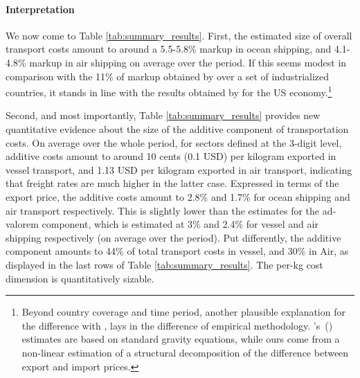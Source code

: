 \documentclass[a4paper,11pt]{article}
\newcommand\cites[1]{\citeauthor{#1}'s\ (\citeyear{#1})}
\begin{document}



\paragraph{Interpretation} We now come to Table \ref{tab:summary_results}. First, the estimated size of overall transport costs amount to around a 5.5-5.8\% markup in ocean shipping, and 4.1-4.8\% markup in air shipping on average over the period.
If this seems modest in comparison with the 11\% of markup obtained by \cite{anderson_wincoop_jel} over a set of industrialized countries, it stands in line with the results obtained by \cite{hummels2007} for the US economy.\footnote{Beyond country coverage and time period, another plausible explanation for the difference with \cite{anderson_wincoop_jel}, lays in the difference of empirical methodology. \cites{anderson_wincoop_jel} estimates are based on standard gravity equations, while ours come from a non-linear estimation of a structural decomposition of the difference between export and import prices.}

Second, and most importantly, Table \ref{tab:summary_results} provides new quantitative evidence about the size of the additive component of transportation costs.
On average over the whole period, for sectors defined at the 3-digit level, additive costs amount to around 10 cents (0.1 USD) per kilogram exported in vessel transport, and 1.13 USD per kilogram exported in air transport, indicating that freight rates are much higher in the latter case.
Expressed in terms of the export price, the additive costs amount to 2.8\% and 1.7\% for ocean shipping and air transport respectively.
This is slightly lower than the estimates for the ad-valorem component, which is estimated at 3\% and 2.4\% for vessel and air shipping respectively (on average over the period).
Put differently, the additive component amounts to 44\% of total transport costs in vessel, and 30\% in Air, as displayed in the last rows of Table \ref{tab:summary_results}. The per-kg cost dimension is quantitatively sizable.
\end{document}
